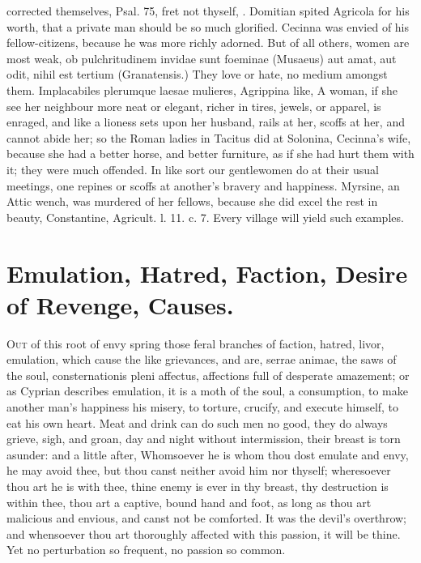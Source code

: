 {corrected themselves, Psal. 75, fret not thyself, \etc{}. Domitian spited
Agricola for his worth, that a private man should be so much
glorified. Cecinna was envied of his fellow-citizens, because he
was more richly adorned. But of all others, women are most weak,
ob pulchritudinem invidae sunt foeminae (Musaeus) aut amat, aut odit,
nihil est tertium (Granatensis.) They love or hate, no medium amongst
them. Implacabiles plerumque laesae mulieres, Agrippina like, A
woman, if she see her neighbour more neat or elegant, richer in tires,
jewels, or apparel, is enraged, and like a lioness sets upon her
husband, rails at her, scoffs at her, and cannot abide her; so the
Roman ladies in Tacitus did at Solonina, Cecinna's wife, because
she had a better horse, and better furniture, as if she had hurt them
with it; they were much offended. In like sort our gentlewomen do at
their usual meetings, one repines or scoffs at another's bravery and
happiness. Myrsine, an Attic wench, was murdered of her fellows, 
because she did excel the rest in beauty, Constantine, Agricult. l. 11.
c. 7. Every village will yield such examples.

\section{Emulation, Hatred, Faction, Desire of Revenge, Causes.}

\lettrine{O}{ut} of this root of envy spring those feral branches of faction,
hatred, livor, emulation, which cause the like grievances, and are,
serrae animae, the saws of the soul, consternationis pleni
affectus, affections full of desperate amazement; or as Cyprian
describes emulation, it is a moth of the soul, a consumption, to
make another man's happiness his misery, to torture, crucify, and
execute himself, to eat his own heart. Meat and drink can do such men
no good, they do always grieve, sigh, and groan, day and night without
intermission, their breast is torn asunder: and a little after,
Whomsoever he is whom thou dost emulate and envy, he may avoid
thee, but thou canst neither avoid him nor thyself; wheresoever thou
art he is with thee, thine enemy is ever in thy breast, thy destruction
is within thee, thou art a captive, bound hand and foot, as long as
thou art malicious and envious, and canst not be comforted. It was the
devil's overthrow; and whensoever thou art thoroughly affected with
this passion, it will be thine. Yet no perturbation so frequent, no
passion so common.

}
